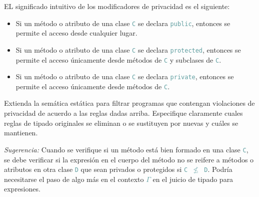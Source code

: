 \documentclass{article}
\newcommand{\tp}[1]{\textcolor{CadetBlue} {\texttt{#1}}}
\newcommand{\ti}[1]{\textcolor{RoyalPurple} {\textit{#1}}}
\begin{document}
\begin{enumerate}
        EL significado intuitivo de los modificadores de privacidad es el
        siguiente:

        \begin{itemize}
            \item Si un método o atributo de una clase \tp{C} se declara
            \tp{public}, entonces se permite el acceso desde cualquier lugar.

            \item Si un método o atributo de una clase \tp{C} se declara
            \tp{protected}, entonces se permite el acceso únicamente desde
            métodos de \tp{C} y subclases de \tp{C}.

            \item Si un método o atributo de una clase \tp{C} se declara
            \tp{private}, entonces se permite el acceso únicamente desde
            métodos de \tp{C}.
        \end{itemize}

        Extienda la semática estática para filtrar programas que contengan
        violaciones de privacidad de acuerdo a las reglas dadas arriba.
        Especifique claramente cuales reglas de tipado originales se eliminan o
        se sustituyen por nuevas y cuáles se mantienen.

        \ti{Sugerencia:} Cuando se verifique si un método está bien formado en
        una clase \tp{C}, se debe verificar si la expresión en el cuerpo del
        método no se reifere a métodos o atributos en otra clase \tp{D} que sean
        privados o protegidos si \tp{C $\not \leq$ D}. Podría necesitarse el
        paso de algo más en el contexto \tp{$\Gamma$} en el juicio de tipado
        para expresiones.

    \end{enumerate}
\end{document}
